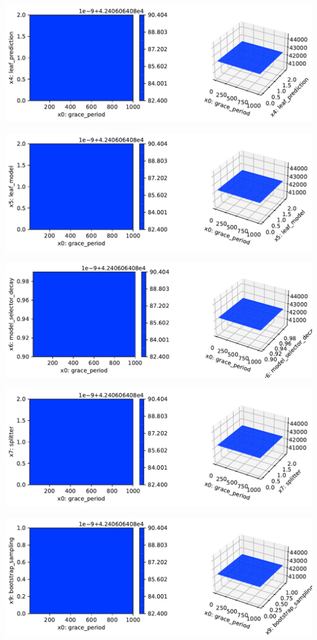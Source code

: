 \documentclass[
  letterpaper,
  DIV=11,
  numbers=noendperiod]{scrreprt}
\begin{document}
\includegraphics{024_spot_hpt_river_friedman_hatr_files/figure-pdf/cell-42-output-5.pdf}

\includegraphics{024_spot_hpt_river_friedman_hatr_files/figure-pdf/cell-42-output-6.pdf}

\includegraphics{024_spot_hpt_river_friedman_hatr_files/figure-pdf/cell-42-output-7.pdf}

\includegraphics{024_spot_hpt_river_friedman_hatr_files/figure-pdf/cell-42-output-8.pdf}

\includegraphics{024_spot_hpt_river_friedman_hatr_files/figure-pdf/cell-42-output-9.pdf}
\end{document}

